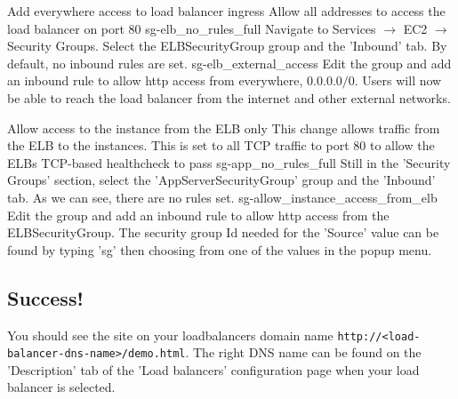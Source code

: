 \FloatBarrier

{Add everywhere access to load balancer ingress}
{
Allow all addresses to access the load balancer on port 80
}
{
	\imagefigsinglebox
	{sg-elb_no_rules_full}
 	{ Navigate to Services  $\rightarrow$ EC2  $\rightarrow$ Security Groups. Select the ELBSecurityGroup group and the 'Inbound' tab. By default, no inbound rules are set.}
	\imagefigsinglebox
	{sg-elb_external_access}
	{Edit the group and add an inbound rule to allow http access from everywhere, $0.0.0.0/0$. Users will now be able to reach the load balancer from the internet and other external networks.}
}


\FloatBarrier


{Allow access to the instance from the ELB only}
{This change allows traffic from the ELB to the instances. This is set to all TCP traffic to port 80 to allow the ELBs TCP-based healthcheck to pass}
{
{
	\imagefigsinglebox
	{sg-app_no_rules_full}
	{Still in the 'Security Groups' section, select the 'AppServerSecurityGroup' group and the 'Inbound' tab. As we can see, there are no rules set.}
	\imagefigsinglebox
	{sg-allow_instance_access_from_elb}
	{Edit the group and add an inbound rule to allow http access from the ELBSecurityGroup. The security group Id needed for the 'Source' value can be found by typing 'sg' then choosing from one of the values in the popup menu.}
}
}

\FloatBarrier

\subsection{Success!}

You should see the site on your loadbalancers domain name \texttt{http://<load-balancer-dns-name>/demo.html}. The right DNS name can be found on the 'Description' tab of the 'Load balancers' configuration page when your load balancer is selected.




\FloatBarrier